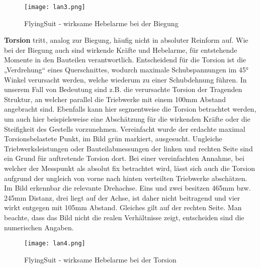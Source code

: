 \begin{figure}[htbp]
    \begin{center}
        \texttt{[image: lan3.png]}
        \caption[FlyingSuit - wirksame Hebelarme bei der Biegung (Abbildungsverzeichnis)]{FlyingSuit - wirksame Hebelarme bei der Biegung}
        
        \label{fig:lan3}
    \end{center}
\end{figure}


\textbf{Torsion} tritt, analog zur Biegung, häufig nicht in absoluter Reinform auf. Wie bei der Biegung auch sind wirkende Kräfte und Hebelarme,
für entstehende Momente in den Bauteilen verantwortlich. Entscheidend für die Torsion ist die „Verdrehung“ eines Querschnittes,
wodurch maximale Schubspannungen im 45° Winkel verursacht werden, welche wiederum zu einer Schubdehnung führen.
In unserem Fall von Bedeutung sind z.B. die verursachte Torsion der Tragenden Struktur, an welcher parallel die Triebwerke mit einem 100mm Abstand angebracht sind.
Ebenfalls kann hier segmentweise die Torsion betrachtet werden, um auch hier beispielsweise eine Abschätzung für die wirkenden Kräfte oder die Steifigkeit des Gestells vorzunehmen.
Vereinfacht wurde der erdachte maximal Torsionsbelastete Punkt, im Bild grün markiert, ausgesucht.
Ungleiche Triebwerksleistungen oder Bauteilabmessungen der linken und rechten Seite sind ein Grund für auftretende Torsion dort.
Bei einer vereinfachten Annahme, bei welcher der Messpunkt als absolut fix betrachtet wird,
lässt sich auch die Torsion aufgrund der ungleich von vorne nach hinten verteilten Triebwerke abschätzen.
Im Bild erkennbar die relevante Drehachse. Eins und zwei besitzen 465mm bzw. 245mm Distanz, drei liegt auf der Achse,
ist daher nicht beitragend und vier wirkt entgegen mit 105mm Abstand. Gleiches gilt auf der rechten Seite.
Man beachte, dass das Bild nicht die realen Verhältnisse zeigt, entscheiden sind die numerischen Angaben.

\begin{figure}[htbp]
    \begin{center}
        \texttt{[image: lan4.png]}
        \caption[FlyingSuit - wirksame Hebelarme bei der Torsion (Abbildungsverzeichnis)]{FlyingSuit - wirksame Hebelarme bei der Torsion}
        
        \label{fig:lan4}
    \end{center}
\end{figure}


